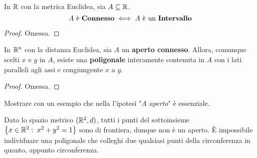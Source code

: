 \begin{proposition}
	In $\mathbb{R}$ con la metrica Euclidea, sia $A \subseteq \mathbb{R}$.
	$$A \text{ è \textbf{Connesso}} \iff A \text{ è un \textbf{Intervallo}}$$
	\begin{proof}
		Omessa.
	\end{proof}
\end{proposition}
\begin{proposition}
	\label{prop:polig_in_aperto_connesso}
	In $\mathbb{R}^n$ con la distanza Euclidea, sia $A$ un \textbf{aperto connesso}. Allora, comunque scelti $x$ e $y$ in $A$, esiste una \textbf{poligonale} interamente contenuta in $A$ con i lati paralleli agli assi e congiungente $x$ a $y$.
	\begin{proof}
		Omessa.
	\end{proof}
\end{proposition}
\begin{exercise}
	Mostrare con un esempio che nella  l'ipotesi "\textit{$A$ aperto}" è essenziale.
	\begin{solution}
		Dato lo spazio metrico $(\mathbb{R}^2,d)$, tutti i punti del sottoinsieme $\left\{x \in \mathbb{R}^2:\;x^2 + y^2 = 1\right\}$ sono di frontiera, dunque non è un aperto. È impossibile individuare una poligonale che colleghi due qualsiasi punti della circonferenza in quanto, appunto circonferenza.
	\end{solution}
\end{exercise}

